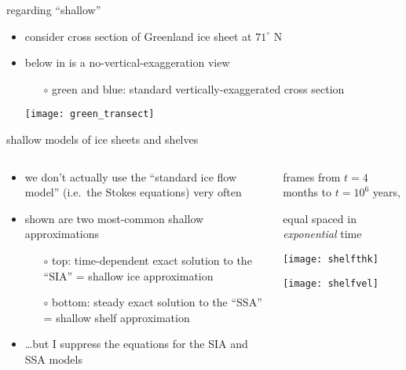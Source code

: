 \documentclass[hide notes,intlimits]{beamer}
\begin{document}
\begin{frame}{regarding ``shallow''}

\begin{itemize}
\item consider cross section of Greenland ice sheet at $71^\circ$ N
\item below in {\color{dark red}{red}} is a no-vertical-exaggeration view
\small
  \begin{itemize}
  \item[$\circ$] green and blue: standard vertically-exaggerated cross section
  \end{itemize}
  \begin{center}
    \texttt{[image: green\_transect]}
  \end{center}
\end{itemize}
\end{frame}


\begin{frame}{shallow models of ice sheets and shelves}

\begin{columns}
\begin{column}{0.5\textwidth}
\small
\begin{itemize}
\item we don't actually use the  ``standard ice flow model'' (i.e.~the Stokes equations) very often
\item shown are two most-common shallow approximations
  \begin{itemize}
  \item[$\circ$] \alert{top}: time-dependent exact solution to the ``SIA'' = shallow ice approximation
  \item[$\circ$] \alert{bottom}: steady exact solution to the ``SSA'' = shallow shelf approximation
  \end{itemize}
\item \dots but I suppress the equations for the SIA and SSA models
\end{itemize}
\end{column}

\begin{column}{0.5\textwidth}
\vspace{-0.25in}

\begin{center}

\tiny 
frames from $t=4$ months to $t = 10^6$ years,

equal spaced in \emph{exponential} time

\bigskip
\texttt{[image: shelfthk]}

\texttt{[image: shelfvel]}
\end{center}
\end{column}
\end{columns}
\end{frame}
\end{document}

